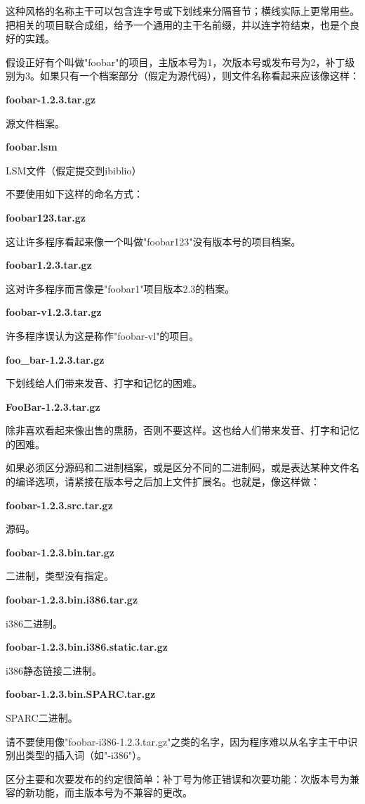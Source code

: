 \documentclass[12pt,oneside]{ctexbook}
\begin{document}
\begin{common-format}
这种风格的名称主干可以包含连字号或下划线来分隔音节；横线实际上更常用些。把相关的项目联合成组，给予一个通用的主干名前缀，并以连字符结束，也是个良好的实践。

假设正好有个叫做"foobar"的项目，主版本号为1，次版本号或发布号为2，补丁级别为3。如果只有一个档案部分（假定为源代码），则文件名称看起来应该像这样：

\textbf{foobar-1.2.3.tar.gz}

源文件档案。

\textbf{foobar.lsm}

LSM文件（假定提交到ibiblio）

不要使用如下这样的命名方式：

\textbf{foobar123.tar.gz}

这让许多程序看起来像一个叫做"foobar123"没有版本号的项目档案。

\textbf{foobar1.2.3.tar.gz}

这对许多程序而言像是"foobar1"项目版本2.3的档案。

\textbf{foobar-v1.2.3.tar.gz}

许多程序误认为这是称作"foobar-vl"的项目。

\textbf{foo\_{}bar-1.2.3.tar.gz}

下划线给人们带来发音、打字和记忆的困难。

\textbf{FooBar-1.2.3.tar.gz}

除非喜欢看起来像出售的熏肠，否则不要这样。这也给人们带来发音、打字和记忆的困难。

如果必须区分源码和二进制档案，或是区分不同的二进制码，或是表达某种文件名的编译选项，请紧接在版本号之后加上文件扩展名。也就是，像这样做：

\textbf{foobar-1.2.3.src.tar.gz}

源码。

\textbf{foobar-1.2.3.bin.tar.gz}

二进制，类型没有指定。

\textbf{foobar-1.2.3.bin.i386.tar.gz}

i386二进制。

\textbf{foobar-1.2.3.bin.i386.static.tar.gz}

i386静态链接二进制。

\textbf{foobar-1.2.3.bin.SPARC.tar.gz}

SPARC二进制。

请不要使用像"foobar-i386-1.2.3.tar.gz"之类的名字，因为程序难以从名字主干中识别出类型的插入词（如"-i386"）。

区分主要和次要发布的约定很简单：补丁号为修正错误和次要功能：次版本号为兼容的新功能，而主版本号为不兼容的更改。


\end{common-format}
\end{document}
